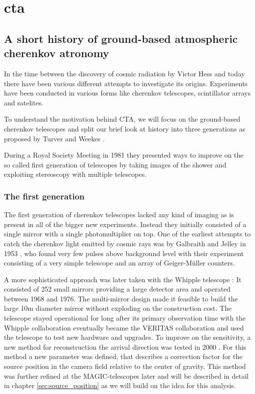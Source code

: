 \chapter{cta}
\label{cta}


\section{A short history of ground-based atmospheric cherenkov atronomy}
In the time between the discovery of cosmic radiation by Victor Hess \cite{Hess:1912srp}
and today there have been various different attempts to investigate its origins.
Experiments have been conducted in various forms like cherenkov telescopes, scintillator 
arrays and satelites.

To understand the motivation behind CTA, 
we will focus on the ground-based 
cherenkov telescopes and split our brief look at history 
into three generations as proposed by Turver and Weekes \cite{turver1980}.

During a Royal Society Meeting in 1981 they presented ways to improve on
the so called first generation of telescopes by taking images of the shower
and exploiting stereoscopy with multiple telescopes.

\subsection{The first generation}
The first generation of cherenkov telescopes 
lacked any kind of imaging as is present in all of the bigger new experiments.
Instead they initially consisted of a single mirror with a single photomultiplier on top.
One of the earliest attempts to catch the cherenkov light emitted by cosmic rays 
was by Galbraith and Jelley in 1953 \cite{1953Natur.171..349G}, who found very few pulses
above background level with their experiment consisting of a very simple 
telescope and an array of Geiger-Müller counters.

A more sophisticated approach was later taken with the Whipple telescope \cite{whipple1968}:
It consisted of 252 small mirrors providing a large detector area and operated between 
1968 and 1976. The multi-mirror design made it feasible to build the large 10m diameter 
mirror without exploding on the construction cost.
The telescope stayed operational for long after its primary observation time
with the Whipple collaboration eventually became the VERITAS collaboration 
and used the telescope to test new hardware and upgrades.
To improve on the sensitivity, a new method for reconstruction 
the arrival direction was tested in 2000 \cite{Lessard:2000yf}.
For this method a new parameter was defined, that describes a correction factor 
for the source position in the camera field relative to the center of gravity.
This method was further refined at the MAGIC-telescopes later and will be described 
in detail in chapter \ref{sec:source_position} as we will build on the idea
for this analysis.

